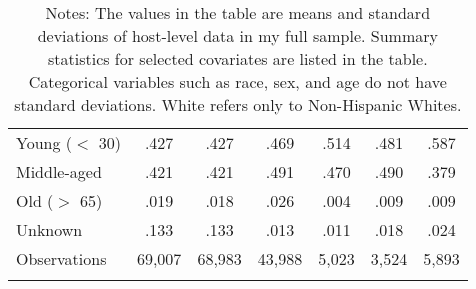 {\begin{longtable}{l*{6}{c}}
		\hspace{3mm}Young ($<$ 30)     &.427 &      .427         &       .469         &      .514        &      .481 	& 		.587         \\
		\hspace{3mm}Middle-aged     & .421&      .421         &       .491        &      .470         &      .490 		& 		.379         \\
		\hspace{3mm}Old ($>$ 65)     & .019&      .018         &       .026         &      .004         &      .009	& 		.009         \\
		\hspace{3mm}Unknown    &  .133&      .133    &       .013         &      .011         &      .018 	& 		.024         \\
		[1em]

		
		\hline
		Observations    &69,007  & 68,983   &       43,988         &       5,023         &       3,524         &       5,893         \\
		\hline\hline
		\caption*{Notes: The values in the table are means and standard deviations of host-level data in my full sample. Summary statistics for selected covariates are listed in the table. Categorical variables such as race, sex, and age do not have standard deviations. White refers only to Non-Hispanic Whites.}
		
	\end{longtable}
}

